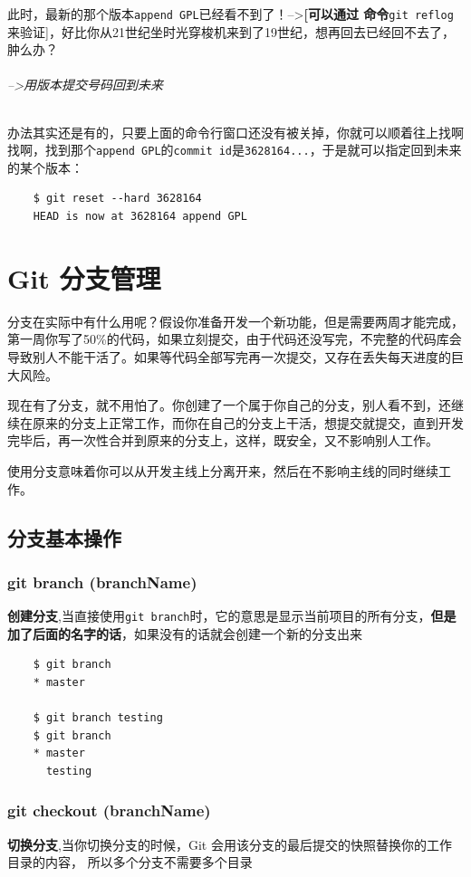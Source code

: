 \documentclass[UTF8,a4paper,12pt]{ctexbook}
\begin{document}
			此时，最新的那个版本\verb|append GPL|已经看不到了！-->\textbf{[可以通过 命令}\verb|git reflog| 来验证]，好比你从21世纪坐时光穿梭机来到了19世纪，想再回去已经回不去了，肿么办？
			
			\subparagraph{-->用版本提交号码回到未来}办法其实还是有的，只要上面的命令行窗口还没有被关掉，你就可以顺着往上找啊找啊，找到那个\verb|append GPL|的\verb|commit id|是\verb|3628164...|，于是就可以指定回到未来的某个版本：
			
			\begin{lstlisting}
	$ git reset --hard 3628164
	HEAD is now at 3628164 append GPL
			\end{lstlisting}
  \chapter{Git 分支管理}
	  分支在实际中有什么用呢？假设你准备开发一个新功能，但是需要两周才能完成，第一周你写了50\%的代码，如果立刻提交，由于代码还没写完，不完整的代码库会导致别人不能干活了。如果等代码全部写完再一次提交，又存在丢失每天进度的巨大风险。
	  
	  现在有了分支，就不用怕了。你创建了一个属于你自己的分支，别人看不到，还继续在原来的分支上正常工作，而你在自己的分支上干活，想提交就提交，直到开发完毕后，再一次性合并到原来的分支上，这样，既安全，又不影响别人工作。
	  
	  使用分支意味着你可以从开发主线上分离开来，然后在不影响主线的同时继续工作。 
	  \section{分支基本操作}
		  \subsection{git branch (branchName)}
			  \textbf{创建分支},当直接使用\verb|git branch|时，它的意思是显示当前项目的所有分支，\textbf{但是加了后面的名字的话}，如果没有的话就会创建一个新的分支出来
			  \begin{lstlisting}
	$ git branch
	* master
	
	$ git branch testing
	$ git branch
	* master
	  testing
			  \end{lstlisting}
		  \subsection{git checkout (branchName)}
			  \textbf{切换分支},当你切换分支的时候，Git 会用该分支的最后提交的快照替换你的工作目录的内容， 所以多个分支不需要多个目录
		  
\end{document}

